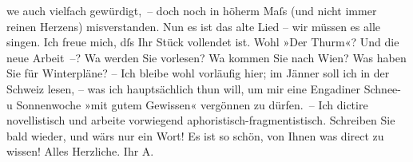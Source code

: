 \begin{ledgroupsized}[t]{13cm}
                  we{\geminationn} auch vielfach gewürdigt, – doch noch in höherm
               Maſs (und nicht immer reinen Herzens) misverstanden. Nun es ist das alte Lied – wir
               müssen es alle singen. Ich freue mich, dſs Ihr Stück vollendet ist. Wohl »Der Thurm«? Und die neue Arbeit –? Wa{\geminationn} werden Sie vorlesen? Wa{\geminationn}
               kommen Sie nach Wien? Was haben Sie für Winterpläne?
               – Ich bleibe wohl vorläufig hier; im Jänner{ }soll {\pb}ich in der Schweiz lesen, – was ich hauptsächlich thun will,
               um mir eine Engadiner Schnee- u Sonnenwoche \strikeout{\textcolor{gray}{ver}} »mit gutem Gewissen« vergönnen
               zu dürfen. – Ich dictire novellistisch und arbeite vorwiegend
               aphoristisch-fragmentistisch. Schreiben Sie bald wieder, und wärs nur ein Wort! Es
               ist so schön, von Ihnen was direct zu wissen! \pend
           \pstart
           Alles Herzliche. Ihr \spacefill\mbox{A.}\pend
                     \endnumbering{}\end{ledgroupsized}  \newcommand{\dateiname}{L02419}\newcommand{\titel}{Arthur Schnitzler an Hugo Hofmannsthal, [5?.] 11. 1924}\newcommand{\editorInnen}{Martin Anton Müller und Gerd-Hermann Susen}
            \footnotesize
\begin{ledgroupsized}[t]{11.5cm}
\end{ledgroupsized}
         
      
